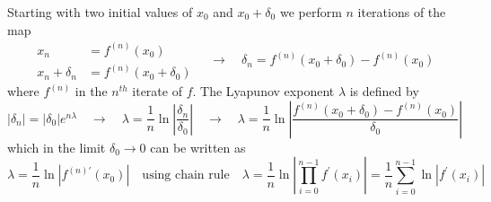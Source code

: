 Starting with two initial values of $x_0$ and $x_0+\delta_0$ we perform $n$ iterations of the map
\begin{equation}
	\begin{aligned}
		x_n&=f^{(n)}(x_0)\\
		x_n+\delta_n&=f^{(n)}(x_0+\delta_0)
	\end{aligned}\quad\rightarrow\quad
	\delta_n=f^{(n)}(x_0+\delta_0)-f^{(n)}(x_0)
\end{equation}
where $f^{(n)}$ in the $n^{th}$ iterate of $f$.
The Lyapunov exponent $\lambda$ is defined by
\begin{equation}
	|\delta_n|=|\delta_0|e^{n\lambda}\quad\rightarrow\quad
	\lambda=\frac{1}{n}\ln\left|\frac{\delta_n}{\delta_0}\right|\quad\rightarrow\quad\lambda=\frac{1}{n}\ln\left|\frac{f^{(n)}(x_0+\delta_0)-f^{(n)}(x_0)}{\delta_0}\right|
\end{equation}
which in the limit $\delta_0\rightarrow0$ can be written as
\begin{equation}
	\lambda=\frac{1}{n}\ln|f^{(n)\prime}(x_0)|\quad\text{using chain rule}\quad\lambda=\frac{1}{n}\ln\left|\prod_{i=0}^{n-1}f^\prime(x_i)\right|=\frac{1}{n}\sum_{i=0}^{n-1}\ln|f^\prime(x_i)|
\end{equation}